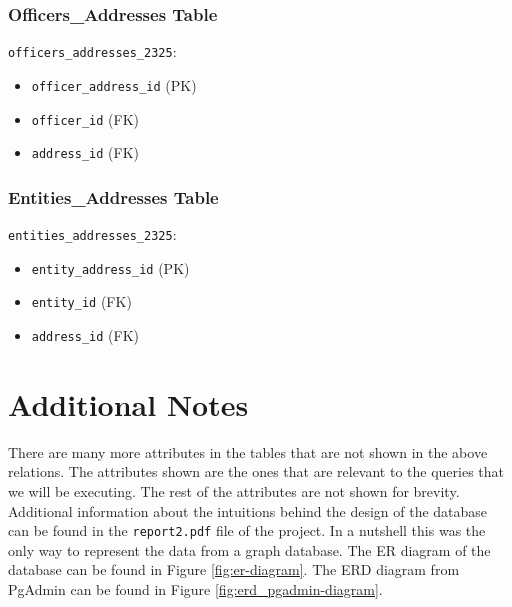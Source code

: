 \documentclass{article}
\begin{document}
\begin{minipage}{0.5\textwidth}
    \subsubsection*{Officers\_Addresses Table}
    \texttt{officers\_addresses\_2325}:
    \begin{itemize}
        \item \texttt{officer\_address\_id} (PK)
        \item \texttt{officer\_id} (FK)
        \item \texttt{address\_id} (FK)
    \end{itemize}

    \subsubsection*{Entities\_Addresses Table}
    \texttt{entities\_addresses\_2325}:
    \begin{itemize}
        \item \texttt{entity\_address\_id} (PK)
        \item \texttt{entity\_id} (FK)
        \item \texttt{address\_id} (FK)
    \end{itemize}

\end{minipage}

\newpage

\section*{\centering Additional Notes}
There are many more attributes in the tables that are not shown in the above relations. The attributes shown are the ones that are relevant to the queries that we will be executing. The rest of the attributes are not shown for brevity. Additional information about the intuitions behind the design of the database can be found in the \texttt{report2.pdf} file of the project. In a nutshell this was the only way to represent the data from a graph database. The ER diagram of the database can be found in Figure \ref{fig:er-diagram}. The ERD diagram from PgAdmin can be found in Figure \ref{fig:erd_pgadmin-diagram}.
\end{document}
